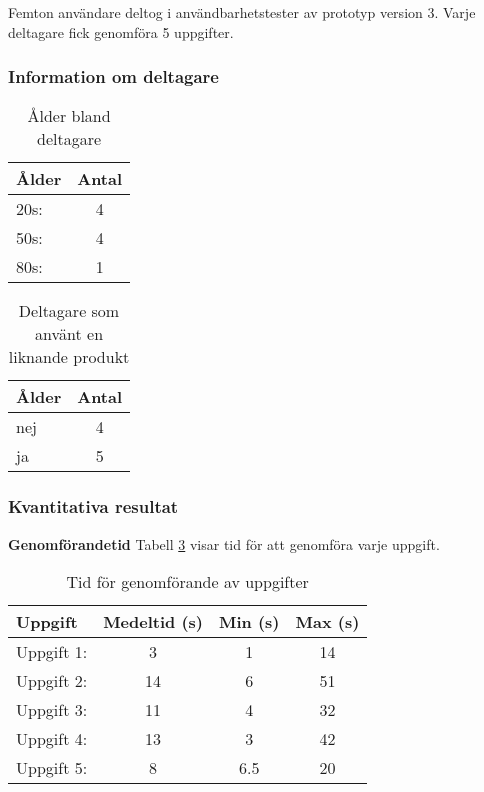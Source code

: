 Femton användare deltog i användbarhetstester av prototyp version 3. Varje deltagare fick genomföra 5 uppgifter. 

\subsubsection{Information om deltagare}

\begin{table}[H]
\centering
\begin{tabular}{|l|c|}
\hline
\textbf{Ålder} & \textbf{Antal} \\
\hline
20s:  & 4  \\ 
50s:  & 4  \\
80s:  & 1  \\
\hline
\end{tabular}
\caption{Ålder bland deltagare}
\label{tab:age2}
\end{table}

\begin{table}[H]
\centering
\begin{tabular}{|l|c|}
\hline
\textbf{Ålder} & \textbf{Antal} \\
\hline
nej  & 4   \\
ja  & 5  \\
\hline
\end{tabular}
\caption{Deltagare som använt en liknande produkt}
\label{tab:exp2}
\end{table}

\subsubsection{Kvantitativa resultat}

\textbf{Genomförandetid}
Tabell \ref{tab:tid} visar tid för att genomföra varje uppgift.
\begin{table}[H]
\centering
\begin{tabular}{|l|c|c|c|}
\hline
\textbf{Uppgift} & \textbf{Medeltid (s)} & \textbf{Min (s)} & \textbf{Max (s)} \\
\hline
Uppgift 1:  & 3 & 1 & 14 \\
Uppgift 2:  & 14 & 6 & 51\\
Uppgift 3:  & 11 & 4 & 32\\
Uppgift 4:  & 13 & 3 & 42\\
Uppgift 5:  & 8 & 6.5 & 20\\
\hline
\end{tabular}
\caption{Tid för genomförande av uppgifter}
\label{tab:tid}
\end{table}

